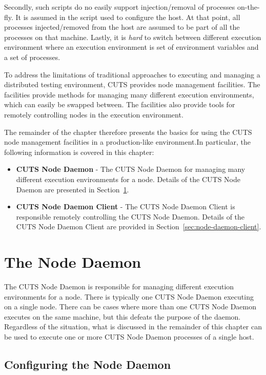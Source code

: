 Secondly, such scripts do no easily support injection/removal
of processes on-the-fly. It is assumed in the script used to 
configure the host. At that point, all processes injected/removed
from the host are assumed to be part of all the processes on 
that machine. Lastly, it is \textit{hard} to switch between
different execution environment where an execution environment
is set of environment variables and a set of processes.

To address the limitations of traditional approaches to executing
and managing a distributed testing environment, CUTS provides
node management facilities. The facilities provide methods for 
managing many different execution environments, which can easily 
be swapped between. The facilities also provide tools for remotely
controlling nodes in the execution environment. 

The remainder of the chapter therefore presents the basics for
using the CUTS node management facilities in a production-like 
environment.In particular, the following information is covered 
in this chapter:
\begin{itemize}
  \item \textbf{CUTS Node Daemon} - The CUTS Node Daemon for 
  managing many different execution environments for a node. 
  Details of the CUTS Node Daemon are presented in Section~\ref{sec:node-daemon}.

  \item \textbf{CUTS Node Daemon Client} - The CUTS Node Daemon Client 
  is responsible remotely controlling the CUTS Node Daemon. Details of 
  the CUTS Node Daemon Client are provided in 
  Section~\ref{sec:node-daemon-client}.
\end{itemize}

\section{The Node Daemon}
\label{sec:node-daemon}

The CUTS Node Daemon is responsible for managing different execution
environments for a node. There is typically one CUTS Node Daemon executing
on a single node. There can be cases where more than one CUTS
Node Daemon executes on the same machine, but this defeats the purpose
of the daemon. Regardless of the situation, what is discussed in the
remainder of this chapter can be used to execute one or more 
CUTS Node Daemon processes of a single host.

\subsection{Configuring the Node Daemon}
\label{sec:node-daemon-config}

